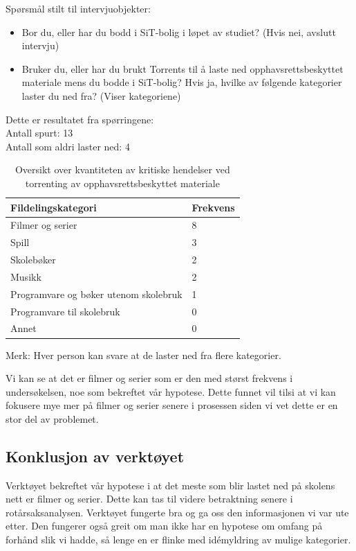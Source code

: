 Spørsmål stilt til intervjuobjekter:
\begin{itemize}
    \item Bor du, eller har du bodd i SiT-bolig i løpet av studiet? (Hvis nei, avslutt intervju)
    \item Bruker du, eller har du brukt Torrents til å laste ned opphavsrettsbeskyttet materiale mens du bodde i SiT-bolig? Hvis ja, hvilke av følgende kategorier laster du ned fra? (Viser kategoriene)
\end{itemize}

\noindent Dette er resultatet fra spørringene: \\
\indent Antall spurt: 13 \\
\indent Antall som aldri laster ned: 4
\begin{table} [H]
    \begin{tabular}{ | m{18em} | m{18em} | }
        \hline
            \cellcolor{yellow} Fildelingskategori & \cellcolor{yellow} Frekvens \\
        \hline
            Filmer og serier & 8  \\
        \hline
            Spill & 3 \\
        \hline
            Skolebøker & 2 \\
        \hline
            Musikk & 2 \\
        \hline
            Programvare og bøker utenom skolebruk & 1 \\
        \hline
            Programvare til skolebruk & 0 \\
        \hline
            Annet & 0 \\
        \hline
    \end{tabular}
    \caption{Oversikt over kvantiteten av kritiske hendelser ved torrenting av opphavsrettsbeskyttet materiale}
    \label{kritisk_tabell_1}
\end{table}

Merk: Hver person kan svare at de laster ned fra flere kategorier.

\noindent Vi kan se at det er filmer og serier som er den med størst frekvens i undersøkelsen, noe som bekreftet vår hypotese. Dette funnet vil tilsi at vi kan fokusere mye mer på filmer og serier senere i prosessen siden vi vet dette er en stor del av problemet. 

\subsection{Konklusjon av verktøyet}
Verktøyet bekreftet vår hypotese i at det meste som blir lastet ned på skolens nett er filmer og serier. Dette kan tas til videre betraktning senere i rotårsaksanalysen. Verktøyet fungerte bra og ga oss den informasjonen vi var ute etter. Den fungerer også greit om man ikke har en hypotese om omfang på forhånd slik vi hadde, så lenge en er flinke med idémyldring av mulige kategorier. 